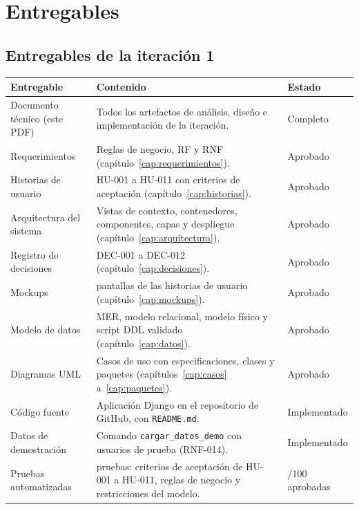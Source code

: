 \chapter{Entregables}\label{cap:entregables}

\section{Entregables de la iteración 1}
\begin{longtable}{>{\raggedright\arraybackslash}p{5.2cm}>{\raggedright\arraybackslash}p{6.6cm}>{\raggedright\arraybackslash}p{2.6cm}}
\toprule
\textbf{Entregable} & \textbf{Contenido} & \textbf{Estado}\\
\midrule\endhead
Documento técnico (este PDF) & Todos los artefactos de análisis, diseño e implementación de la iteración. & Completo\\
Requerimientos & Reglas de negocio, RF y RNF (capítulo~\ref{cap:requerimientos}). & Aprobado\\
Historias de usuario & HU-001 a HU-011 con criterios de aceptación (capítulo~\ref{cap:historias}). & Aprobado\\
Arquitectura del sistema & Vistas de contexto, contenedores, componentes, capas y despliegue (capítulo~\ref{cap:arquitectura}). & Aprobado\\
Registro de decisiones & DEC-001 a DEC-012 (capítulo~\ref{cap:decisiones}). & Aprobado\\
Mockups & 12 pantallas de las historias de usuario (capítulo~\ref{cap:mockups}). & Aprobado\\
Modelo de datos & MER, modelo relacional, modelo físico y script DDL validado (capítulo~\ref{cap:datos}). & Aprobado\\
Diagramas UML & Casos de uso con especificaciones, clases y paquetes (capítulos~\ref{cap:casos} a~\ref{cap:paquetes}). & Aprobado\\
Código fuente & Aplicación Django en el repositorio de GitHub, con \texttt{README.md}. & Implementado\\
Datos de demostración & Comando \texttt{cargar\_datos\_demo} con usuarios de prueba (RNF-014). & Implementado\\
Pruebas automatizadas & 100 pruebas: criterios de aceptación de HU-001 a HU-011, reglas de negocio y restricciones del modelo. & 100/100 aprobadas\\
\bottomrule
\end{longtable}

